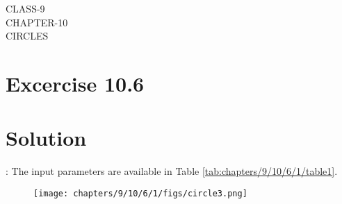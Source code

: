 \documentclass[12pt]{article}
\begin{document}
\begin{center}
\textbf\large{CLASS-9\\CHAPTER-10 \\ CIRCLES}

\end{center}
\section*{Excercise 10.6}

\section*{\large Solution}:
\fi
The input parameters are available in Table 
	\ref{tab:chapters/9/10/6/1/table1}.
\begin{figure}[H]
\centering
\texttt{[image: chapters/9/10/6/1/figs/circle3.png]}
\caption{}
\label{fig:chapters/9/10/6/1/Fig1}
\end{figure}
\end{document}
